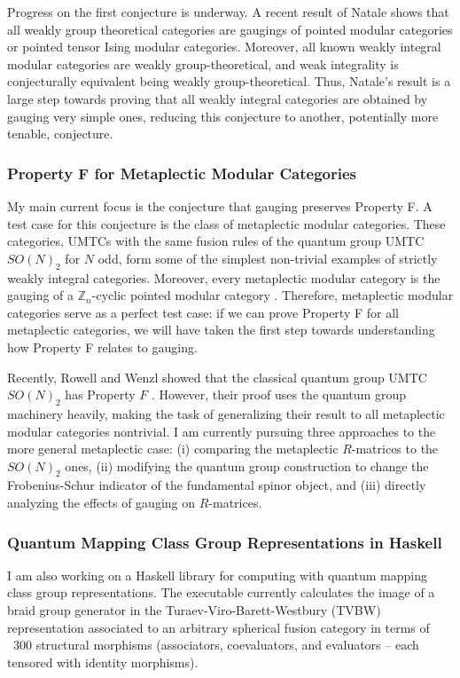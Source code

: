 \documentclass[12pt]{article}
\newcommand{\ZZ}{\mathbb{Z}}
\theoremstyle{plain} \numberwithin{equation}{section}
\theoremstyle{definition}
\begin{document}
Progress on the first conjecture is underway. A recent result of Natale \cite{n} shows that all weakly group theoretical categories are gaugings of pointed modular categories or pointed tensor Ising modular categories.  Moreover, all known weakly integral modular categories are weakly group-theoretical, and weak integrality is conjecturally equivalent being weakly group-theoretical.  Thus, Natale's result is a large step towards proving that all weakly integral categories are obtained by gauging very simple ones, reducing this conjecture to another, potentially more tenable, conjecture.

\subsubsection*{Property F for Metaplectic Modular Categories}

My main current focus is the conjecture that gauging preserves Property F. A test case for this conjecture is the class of metaplectic modular categories.  These categories, UMTCs with the same fusion rules of the quantum group UMTC $SO(N)_2$ for $N$ odd,  form some of the simplest non-trivial examples of strictly weakly integral categories.   Moreover, every metaplectic modular category is the gauging of a $\ZZ_n$-cyclic pointed modular category \cite{acrw}.  Therefore, metaplectic modular categories serve as a perfect test case:  if we can prove Property F for all metaplectic categories, we will have taken the first step towards understanding how Property F relates to gauging.  

Recently,  Rowell and Wenzl showed that the classical quantum group UMTC $SO(N)_2$ has Property $F$ \cite{rw}.  However, their proof uses the quantum group machinery heavily, making the task of generalizing their result to all metaplectic modular categories nontrivial.  I am currently pursuing three approaches  to the more general metaplectic case: (i) comparing the metaplectic $R$-matrices to the $SO(N)_2$ ones, (ii) modifying the quantum group construction to change the Frobenius-Schur indicator of the fundamental spinor object, and (iii) directly analyzing the effects of gauging on $R$-matrices.

\subsubsection*{Quantum Mapping Class Group Representations in Haskell}
I am also working on a Haskell library for computing with quantum mapping class group representations.  The executable currently calculates the image of a braid group generator in the Turaev-Viro-Barett-Westbury (TVBW) representation associated to an arbitrary spherical fusion category in terms of ~300 structural morphisms (associators, coevaluators, and evaluators -- each tensored with identity morphisms).
\end{document}

